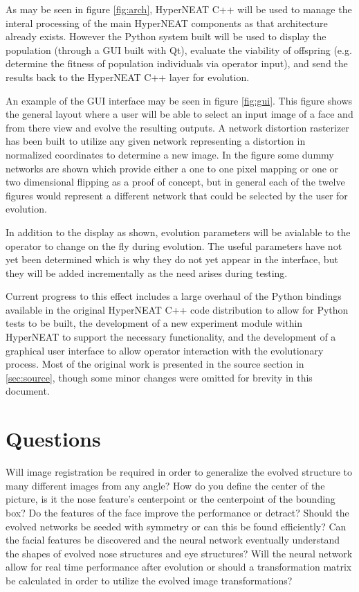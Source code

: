 \documentclass[a4paper,10pt]{article}
\begin{document}
As may be seen in figure \ref{fig:arch}, HyperNEAT C++ will be used to manage the interal processing of the main HyperNEAT components as that architecture already exists. However the Python system built will be used to display the population (through a GUI built with Qt), evaluate the viability of offspring (e.g. determine the fitness of population individuals via operator input), and send the results back to the HyperNEAT C++ layer for evolution.

An example of the GUI interface may be seen in figure \ref{fig:gui}. This figure shows the general layout where a user will be able to select an input image of a face and from there view and evolve the resulting outputs. A network distortion rasterizer has been built to utilize any given network representing a distortion in normalized coordinates to determine a new image. In the figure some dummy networks are shown which provide either a one to one pixel mapping or one or two dimensional flipping as a proof of concept, but in general each of the twelve figures would represent a different network that could be selected by the user for evolution.

In addition to the display as shown, evolution parameters will be avialable to the operator to change on the fly during evolution. The useful parameters have not yet been determined which is why they do not yet appear in the interface, but they will be added incrementally as the need arises during testing.

Current progress to this effect includes a large overhaul of the Python bindings available in the original HyperNEAT C++ code distribution to allow for Python tests to be built, the development of a new experiment module within HyperNEAT to support the necessary functionality, and the development of a graphical user interface to allow operator interaction with the evolutionary process. Most of the original work is presented in the source section in \ref{sec:source}, though some minor changes were omitted for brevity in this document.

\section{Questions}

Will image registration be required in order to generalize the evolved structure to many different images from any angle? How do you define the center of the picture, is it the nose feature’s centerpoint or the centerpoint of the bounding box? Do the features of the face improve the performance or detract? Should the evolved networks be seeded with symmetry or can this be found efficiently? Can the facial features be discovered and the neural network eventually understand the shapes of evolved nose structures and eye structures? Will the neural network allow for real time performance after evolution or should a transformation matrix be calculated in order to utilize the evolved image transformations?
\end{document}

